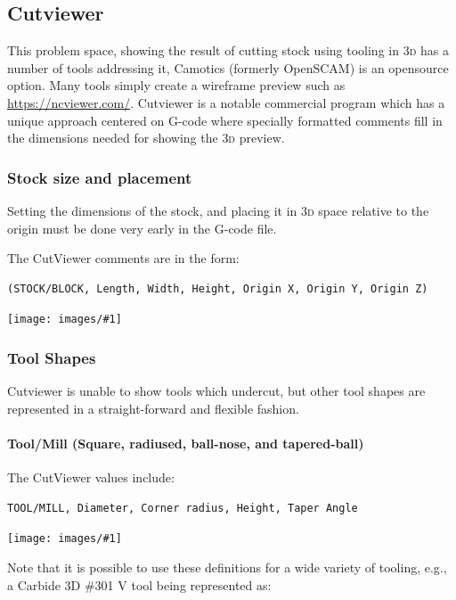 \documentclass{ltxdoc}
\newcommand{\includeimage}[1]{\bigskip\noindent\texttt{[image: images/\#1]}\bigskip}
\begin{document}
\subsection{Cutviewer}

This problem space, showing the result of cutting stock using tooling in \textsc{3d} has a number of tools addressing it, Camotics (formerly OpenSCAM) is an opensource option. Many tools simply create a wireframe preview such as \url{https://ncviewer.com/}. Cutviewer is a notable commercial program which has a unique approach centered on G-code where specially formatted comments fill in the dimensions needed for showing the \textsc{3d} preview.

\subsubsection{Stock size and placement}

Setting the dimensions of the stock, and placing it in \textsc{3d} space relative to the origin must be done very early in the G-code file.

The CutViewer comments are in the form:

\begin{verbatim}
(STOCK/BLOCK, Length, Width, Height, Origin X, Origin Y, Origin Z)
\end{verbatim}

\includeimage{cutviewer_stocksize.png}

\subsubsection{Tool Shapes}

Cutviewer is unable to show tools which undercut, but other tool shapes are represented in a straight-forward and flexible fashion.

\paragraph{Tool/Mill (Square, radiused, ball-nose, and tapered-ball)}

The CutViewer values include:

\begin{verbatim}
TOOL/MILL, Diameter, Corner radius, Height, Taper Angle
\end{verbatim}

\includeimage{cutviewer_tool_mill.png}

\noindent Note that it is possible to use these definitions for a wide variety of tooling, e.g., a Carbide 3D \#301 V tool being represented as:
\end{document}
